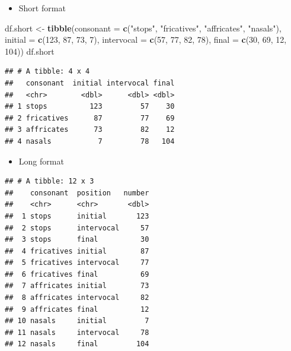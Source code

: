 \documentclass[]{book}
\newenvironment{Shaded}{\begin{snugshade}}{\end{snugshade}}
\newcommand{\DataTypeTok}[1]{\textcolor[rgb]{0.13,0.29,0.53}{#1}}
\newcommand{\DecValTok}[1]{\textcolor[rgb]{0.00,0.00,0.81}{#1}}
\newcommand{\KeywordTok}[1]{\textcolor[rgb]{0.13,0.29,0.53}{\textbf{#1}}}
\newcommand{\NormalTok}[1]{#1}
\newcommand{\StringTok}[1]{\textcolor[rgb]{0.31,0.60,0.02}{#1}}
\providecommand{\tightlist}{%
  \setlength{\itemsep}{0pt}\setlength{\parskip}{0pt}}
\begin{document}
\begin{itemize}
\tightlist
\item
  Short format
\end{itemize}

\begin{Shaded}
\begin{Highlighting}[]
\NormalTok{df.short <-}\StringTok{ }\KeywordTok{tibble}\NormalTok{(}\DataTypeTok{consonant =} \KeywordTok{c}\NormalTok{(}\StringTok{"stops"}\NormalTok{, }\StringTok{"fricatives"}\NormalTok{, }\StringTok{"affricates"}\NormalTok{, }\StringTok{"nasals"}\NormalTok{),}
                   \DataTypeTok{initial =} \KeywordTok{c}\NormalTok{(}\DecValTok{123}\NormalTok{, }\DecValTok{87}\NormalTok{, }\DecValTok{73}\NormalTok{, }\DecValTok{7}\NormalTok{),}
                   \DataTypeTok{intervocal =} \KeywordTok{c}\NormalTok{(}\DecValTok{57}\NormalTok{, }\DecValTok{77}\NormalTok{, }\DecValTok{82}\NormalTok{, }\DecValTok{78}\NormalTok{),}
                   \DataTypeTok{final =} \KeywordTok{c}\NormalTok{(}\DecValTok{30}\NormalTok{, }\DecValTok{69}\NormalTok{, }\DecValTok{12}\NormalTok{, }\DecValTok{104}\NormalTok{))}
\NormalTok{df.short}
\end{Highlighting}
\end{Shaded}

\begin{verbatim}
## # A tibble: 4 x 4
##   consonant  initial intervocal final
##   <chr>        <dbl>      <dbl> <dbl>
## 1 stops          123         57    30
## 2 fricatives      87         77    69
## 3 affricates      73         82    12
## 4 nasals           7         78   104
\end{verbatim}

\begin{itemize}
\tightlist
\item
  Long format
\end{itemize}

\begin{verbatim}
## # A tibble: 12 x 3
##    consonant  position   number
##    <chr>      <chr>       <dbl>
##  1 stops      initial       123
##  2 stops      intervocal     57
##  3 stops      final          30
##  4 fricatives initial        87
##  5 fricatives intervocal     77
##  6 fricatives final          69
##  7 affricates initial        73
##  8 affricates intervocal     82
##  9 affricates final          12
## 10 nasals     initial         7
## 11 nasals     intervocal     78
## 12 nasals     final         104
\end{verbatim}
\end{document}
